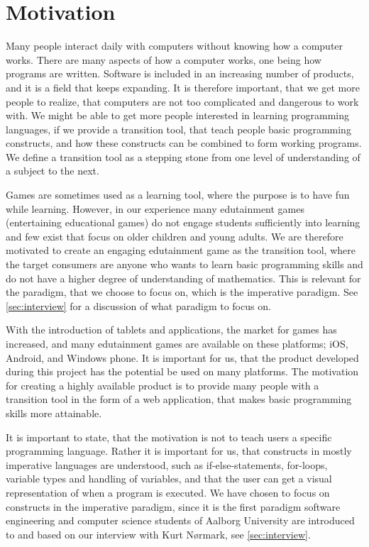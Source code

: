 \section{Motivation}
\label{sec:motivation}

Many people interact daily with computers without knowing how a computer works.
There are many aspects of how a computer works, one being how programs are written.
Software is included in an increasing number of products, and it is a field that keeps expanding.\cite{idaArtikelMangel}\cite{forbesMoreProgrammers}
It is therefore important, that we get more people to realize, that computers are not too complicated and dangerous to work with.
We might be able to get more people interested in learning programming languages, if we provide a transition tool, that teach people basic programming constructs, and how these constructs can be combined to form working programs.
We define a transition tool as a stepping stone from one level of understanding of a subject to the next.\newline

Games are sometimes used as a learning tool, where the purpose is to have fun while learning.
However, in our experience many edutainment games (entertaining educational games) do not engage students sufficiently into learning and few exist that focus on older children and young adults. 
We are therefore motivated to create an engaging edutainment game as the transition tool, where the target consumers are anyone who wants to learn basic programming skills and do not have a higher degree of understanding of mathematics. This is relevant for the paradigm, that we choose to focus on, which is the imperative paradigm. See \autoref{sec:interview} for a discussion of what paradigm to focus on.\newline

With the introduction of tablets and applications, the market for games has increased, and many edutainment games are available on these platforms; iOS, Android, and Windows phone.
It is important for us, that the product developed during this project has the potential be used on many platforms.
The motivation for creating a highly available product is to provide many people with a transition tool in the form of a web application, that makes basic programming skills more attainable.\newline

It is important to state, that the motivation is not to teach users a specific programming language.
Rather it is important for us, that constructs in mostly imperative languages are understood, such as if-else-statements, for-loops, variable types and handling of variables, and that the user can get a visual representation of when a program is executed. We have chosen to focus on constructs in the imperative paradigm, since it is the first paradigm software engineering and computer science students of Aalborg University are introduced to and based on our interview with Kurt N{\o}rmark, see \autoref{sec:interview}.\newline

